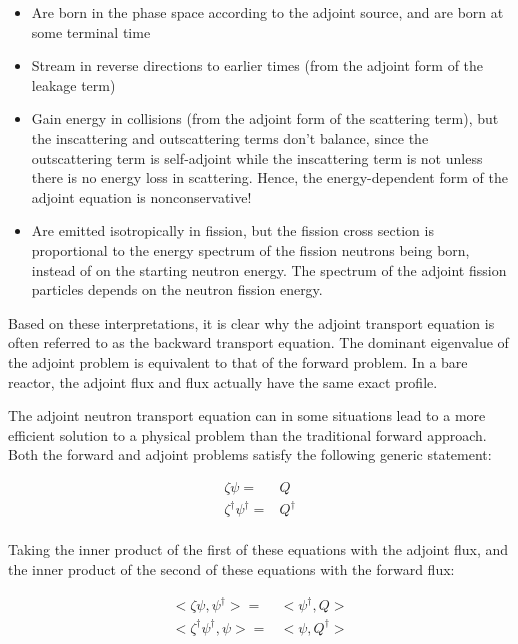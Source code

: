 \documentclass[10pt]{article}
\begin{document}
\begin{flushleft}
\begin{itemize}
\item Are born in the phase space according to the adjoint source, and are born at some terminal time
\item Stream in reverse directions to earlier times (from the adjoint form of the leakage term)
\item Gain energy in collisions (from the adjoint form of the scattering term), but the inscattering and outscattering terms don't balance, since the outscattering term is self-adjoint while the inscattering term is not unless there is no energy loss in scattering. Hence, the energy-dependent form of the adjoint equation is nonconservative!
\item Are emitted isotropically in fission, but the fission cross section is proportional to the energy spectrum of the fission neutrons being born, instead of on the starting neutron energy. The spectrum of the adjoint fission particles depends on the neutron fission energy.
\end{itemize}

Based on these interpretations, it is clear why the adjoint transport equation is often referred to as the backward transport equation. The dominant eigenvalue of the adjoint problem is equivalent to that of the forward problem. In a bare reactor, the adjoint flux and flux actually have the same exact profile. 

The adjoint neutron transport equation can in some situations lead to a more efficient solution to a physical problem than the traditional forward approach. Both the forward and adjoint problems satisfy the following generic statement:

\begin{equation}
\begin{aligned}
\zeta\psi=& Q\\
\zeta^\dagger\psi^\dagger=& Q^\dagger\\
\end{aligned}
\end{equation}

Taking the inner product of the first of these equations with the adjoint flux, and the inner product of the second of these equations with the forward flux:

\begin{equation}
\begin{aligned}
<\zeta\psi,\psi^\dagger>=& <\psi^\dagger,Q>\\
<\zeta^\dagger\psi^\dagger,\psi>=& <\psi,Q^\dagger>\\
\end{aligned}
\end{equation}
 

\end{flushleft}
\end{document}
